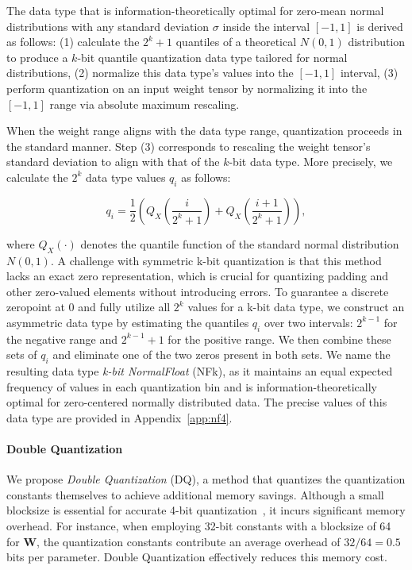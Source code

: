 The data type that is information-theoretically optimal for zero-mean normal distributions with any standard deviation $\sigma$ inside the interval $[-1, 1]$ is derived as follows: (1) calculate the $2^k+1$ quantiles of a theoretical $N(0, 1)$ distribution to produce a $k$-bit quantile quantization data type tailored for normal distributions, (2) normalize this data type’s values into the $[-1, 1]$ interval, (3) perform quantization on an input weight tensor by normalizing it into the $[-1, 1]$ range via absolute maximum rescaling.

When the weight range aligns with the data type range, quantization proceeds in the standard manner. Step (3) corresponds to rescaling the weight tensor’s standard deviation to align with that of the $k$-bit data type. More precisely, we calculate the $2^k$ data type values $q_i$ as follows:

\begin{equation}
q_i  = \frac{1}{2}\left( Q_X\left(\frac{i}{2^k+1}\right) + Q_X\left(\frac{i+1}{2^k+1}\right)\right),
\end{equation}

where $Q_X(\cdot)$ denotes the quantile function of the standard normal distribution $N(0,1)$. A challenge with symmetric k-bit quantization is that this method lacks an exact zero representation, which is crucial for quantizing padding and other zero-valued elements without introducing errors. To guarantee a discrete zeropoint at $0$ and fully utilize all $2^k$ values for a k-bit data type, we construct an asymmetric data type by estimating the quantiles $q_i$ over two intervals: $2^{k-1}$ for the negative range and $2^{k-1}+1$ for the positive range. We then combine these sets of $q_i$ and eliminate one of the two zeros present in both sets. We name the resulting data type \emph{k-bit NormalFloat} (NFk), as it maintains an equal expected frequency of values in each quantization bin and is information-theoretically optimal for zero-centered normally distributed data. The precise values of this data type are provided in Appendix~\ref{app:nf4}.

\paragraph{Double Quantization{}}
We propose \emph{Double Quantization} (DQ), a method that quantizes the quantization constants themselves to achieve additional memory savings. Although a small blocksize is essential for accurate 4-bit quantization~\citep{dettmers2022case}, it incurs significant memory overhead. For instance, when employing 32-bit constants with a blocksize of 64 for $\mathbf{W}$, the quantization constants contribute an average overhead of $32/64 = 0.5$ bits per parameter. Double Quantization effectively reduces this memory cost.

